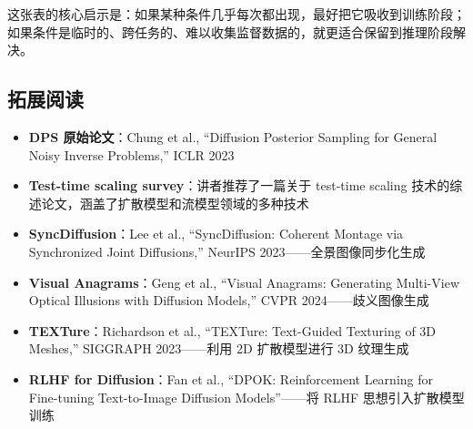 这张表的核心启示是：如果某种条件几乎每次都出现，最好把它吸收到训练阶段；如果条件是临时的、跨任务的、难以收集监督数据的，就更适合保留到推理阶段解决。

\subsection{拓展阅读}

\begin{itemize}
    \item \textbf{DPS 原始论文}：Chung et al., ``Diffusion Posterior Sampling for General Noisy Inverse Problems,'' ICLR 2023
    \item \textbf{Test-time scaling survey}：讲者推荐了一篇关于 test-time scaling 技术的综述论文，涵盖了扩散模型和流模型领域的多种技术
    \item \textbf{SyncDiffusion}：Lee et al., ``SyncDiffusion: Coherent Montage via Synchronized Joint Diffusions,'' NeurIPS 2023——全景图像同步化生成
    \item \textbf{Visual Anagrams}：Geng et al., ``Visual Anagrams: Generating Multi-View Optical Illusions with Diffusion Models,'' CVPR 2024——歧义图像生成
    \item \textbf{TEXTure}：Richardson et al., ``TEXTure: Text-Guided Texturing of 3D Meshes,'' SIGGRAPH 2023——利用 2D 扩散模型进行 3D 纹理生成
    \item \textbf{RLHF for Diffusion}：Fan et al., ``DPOK: Reinforcement Learning for Fine-tuning Text-to-Image Diffusion Models''——将 RLHF 思想引入扩散模型训练
\end{itemize}



